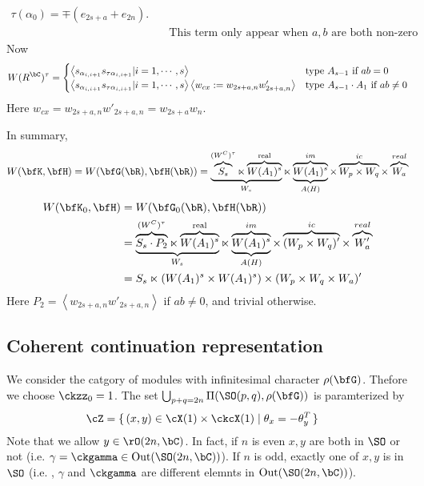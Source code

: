 \documentclass[12pt,a4paper]{amsart}
\def\gen#1{\left\langle
    #1
      \right\rangle}
\numberwithin{equation}{section}
\theoremstyle{remark}
\begin{document}
\begin{des}
\[\begin{split}
{        \tau(\alpha_0)=\mp(e_{2s+a}+e_{2n})}.  \\
      &  \quad \text{This term only appear when
        $a,b$ are both non-zero}
    \end{split}
  \]
  Now
  \[
    W(R^\bC)^\tau =
    \begin{cases}
      \gen{s_{\alpha_{i,i+1}}s_{\tau \alpha_{i,i+1}}| i=1,
        \cdots, s} & \text{type $A_{s-1}$ if $ab=0$}\\
      \gen{s_{\alpha_{i,i+1}}s_{\tau \alpha_{i,i+1}}| i=1,
        \cdots, s} \gen{w_{cx} := w_{2s+a,n}w'_{2s+a,n}}& \text{type $A_{s-1}\cdot A_1$ if $ab\neq 0$}\\
    \end{cases}
  \]
  Here $w_{cx} = w_{2s+a,n}w'_{2s+a,n} = w_{2s+a} w_n$.
\end{des}


In summary,
\begin{equation}\label{eq:W_KH.C}
  W(\bfK,\bfH)= W(\bfG(\bR),\bfH(\bR))=\underbrace {\overbrace{ S_s }^{(W^C)^\tau} \ltimes
    \overbrace{W(A_1)^s}^{\text{real}}}_{W_s }\ltimes
  \underbrace{\overbrace{W(A_1)^s}^{im}}_{A(H)}\times
  \overbrace{W_p\times W_q}^{ic} \times \overbrace{W_{a}}^{real}
\end{equation}
\begin{equation}\label{eq:W_KH.C'}
  \begin{split}
    W(\bfK_0,\bfH) &= W(\bfG_0(\bR),\bfH(\bR)) \\
    & =\underbrace {\overbrace{ S_s \cdot P_2}^{(W^C)^\tau} \ltimes
      \overbrace{W(A_1)^s}^{\text{real}}}_{W_s }\ltimes
    \underbrace{\overbrace{W(A_1)^s}^{im}}_{A(H)}\times \overbrace{(W_p\times
      W_q)'}^{ic} \times \overbrace{W'_{a}}^{real} \\
    & = S_s \ltimes ( W(A_1)^s \times W(A_1)^s) \times (W_p\times W_q \times
    W_{a})'
  \end{split}
\end{equation}
Here $P_2 = \gen{w_{2s+a,n}w'_{2s+a,n}}$ if $ab\neq 0$, and trivial otherwise.


\subsection{Coherent continuation representation}
We consider the catgory of modules with infinitesimal character $\rho(\bfG)$.
Thefore we choose $\ckzz_0 = 1$.  The set
$\bigcup_{p+q=2n} \Pi(\SO(p,q),\rho(\bfG))$ is paramterized by
\[
  \begin{split}
    \cZ &= \set{(x,y)\in \cX(1)\times \ckcX(1) |\theta_x = -\theta_y^T}
  \end{split}
\]
Note that we allow $y\in \rO(2n,\bC)$. In fact, if $n$ is even $x,y$ are both in
$\SO$ or not (i.e. $\gamma=\ckgamma\in \mathrm{Out}(\SO(2n,\bC))$). If $n$ is
odd, exactly one of $x,y$ is in $\SO$ (i.e. , $\gamma$ and $\ckgamma$ are
different elemnts in $\mathrm{Out}(\SO(2n,\bC))$).
\end{document}
